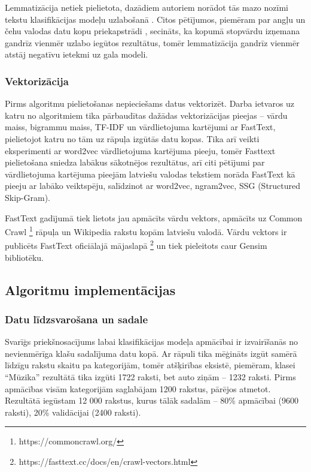 Lemmatizācija netiek pielietota, dazādiem autoriem norādot tās mazo nozīmi tekstu klasifikācijas modeļu uzlabošanā \cite{santos2023effect}. Citos pētījumos, piemēram par angļu un čehu valodas datu kopu priekapstrādi \cite{normalizationTextClassification}, secināts, ka kopumā stopvārdu izņemana gandrīz vienmēr uzlabo iegūtos rezultātus, tomēr lemmatizācija gandrīz vienmēr atstāj negatīvu ietekmi uz gala modeli.

\subsubsection{Vektorizācija}
Pirms algoritmu pielietošanas nepieciešams datus vektorizēt. Darba ietvaros uz katru no algoritmiem tika pārbaudītas dažādas vektorizācijas pieejas – vārdu maiss, bigrammu maiss, TF-IDF un vārdlietojuma kartējumi ar FastText, pielietojot katru no tām uz rāpuļa izgūtās datu kopas. Tika arī veikti eksperimenti ar word2vec vārdlietojuma kartējuma pieeju, tomēr Fasttext pielietošana sniedza labākus sākotnējos rezultātus, arī citi pētījumi par vārdlietojuma kartējuma pieejām latviešu valodas tekstiem \cite{LaucisJekabsonWordEmbedding} norāda FastText kā pieeju ar labāko veiktspēju, salīdzinot ar word2vec, ngram2vec, SSG (Structured Skip-Gram).

FastText gadījumā tiek lietots jau apmācīts vārdu vektors, apmācīts uz Common Crawl \footnote{https://commoncrawl.org/} rāpuļa un Wikipedia rakstu kopām latviešu valodā. Vārdu vcktors ir publicēts FastText oficiālajā mājaslapā \footnote{https://fasttext.cc/docs/en/crawl-vectors.html} un tiek pieleitots caur Gensim bibliotēku.

\subsection{Algoritmu implementācijas}

\subsubsection{Datu līdzsvarošana un sadale}
Svarīģs priekšnosacījums labai klasifikācijas modeļa apmācībai ir izvairīšanās no nevienmērīga klašu sadalījuma datu kopā. Ar rāpuli tika mēģināts izgūt samērā līdzīgu rakstu skaitu pa kategorijām, tomēr atšķirības eksistē, piemēram, klasei “Mūzika” rezultātā tika izgūti 1722 raksti, bet auto ziņām – 1232 raksti. Pirms apmācības visām kategorijām saglabājam 1200 rakstus, pārējos atmetot. Rezultātā iegūstam 12 000 rakstus, kurus tālāk sadalām – 80\% apmācībai (9600 raksti), 20\% validācijai (2400 raksti).

